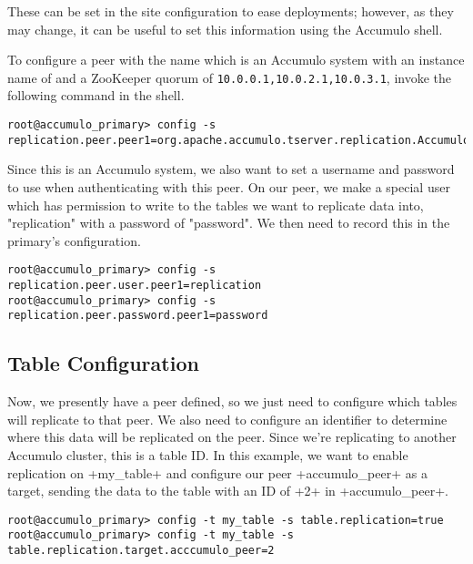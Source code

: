These can be set in the site configuration to ease deployments; however, as they may
change, it can be useful to set this information using the Accumulo shell.

To configure a peer with the name  which is an Accumulo system with an instance name of
and a ZooKeeper quorum of \texttt{10.0.0.1,10.0.2.1,10.0.3.1}, invoke the following
command in the shell.

\begingroup\fontsize{8pt}{8pt}\selectfont\begin{verbatim}
root@accumulo_primary> config -s
replication.peer.peer1=org.apache.accumulo.tserver.replication.AccumuloReplicaSystem,accumulo_peer,10.0.0.1,10.0.2.1,10.0.3.1
\end{verbatim}\endgroup

Since this is an Accumulo system, we also want to set a username and password
to use when authenticating with this peer. On our peer, we make a special user
which has permission to write to the tables we want to replicate data into, "replication"
with a password of "password". We then need to record this in the primary's configuration.

\begingroup\fontsize{8pt}{8pt}\selectfont\begin{verbatim}
root@accumulo_primary> config -s replication.peer.user.peer1=replication
root@accumulo_primary> config -s replication.peer.password.peer1=password
\end{verbatim}\endgroup

\subsection{Table Configuration}

Now, we presently have a peer defined, so we just need to configure which tables will
replicate to that peer. We also need to configure an identifier to determine where
this data will be replicated on the peer. Since we're replicating to another Accumulo
cluster, this is a table ID. In this example, we want to enable replication on
+my_table+ and configure our peer +accumulo_peer+ as a target, sending
the data to the table with an ID of +2+ in +accumulo_peer+.

\begingroup\fontsize{8pt}{8pt}\selectfont\begin{verbatim}
root@accumulo_primary> config -t my_table -s table.replication=true
root@accumulo_primary> config -t my_table -s table.replication.target.acccumulo_peer=2
\end{verbatim}\endgroup

